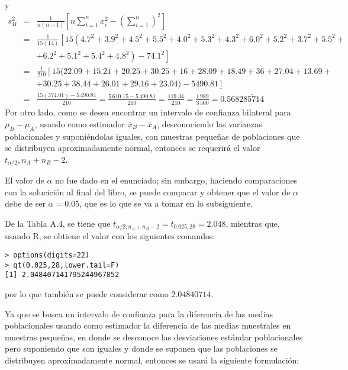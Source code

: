 \begin{solucion}
 y
 \begin{eqnarray*}
  s_B^2 & = & \frac{1}{n(n-1)} \left[ n\sum_{i=1}^n x_i^2 - \left( \sum_{i=1}^n \right)^2 \right] \\
  & = & \frac{1}{15(14)} \left[ 15\left( 4.7^2 + 3.9^2 + 4.5^2 + 5.5^2 + 4.0^2 + 5.3^2 + 4.3^2 + 6.0^2 + 5.2^2 + 3.7^2 + 5.5^2 + \right. \right. \\
  & & \left. \left. + 6.2^2 + 5.1^2 + 5.4^2 + 4.8^2 \right) - 74.1^2 \right] \\
  & = & \frac{1}{210}\left[ 15( 22.09 + 15.21 + 20.25 + 30.25 + 16 + 28.09 + 18.49 + 36 + 27.04 + 13.69 + \right. \\
  & & \left. + 30.25 + 38.44 + 26.01 + 29.16 + 23.04 ) - 5490.81 \right] \\
  & = & \frac{15(374.01) - 5\,490.81}{210} = \frac{5\,610.15 - 5\,490.81}{210} = \frac{119.34}{210} = \frac{1\,989}{3\,500} = 0.568\overline{285714}
 \end{eqnarray*}
 Por otro lado, como se desea encontrar un intervalo de confianza bilateral para $\mu_B - \mu_A$, usando como estimador $\bar{x}_B - \bar{x}_A$, desconociendo las varianzas poblacionales y suponi\'endolas iguales, con muestras peque\~nas de poblaciones que se distribuyen aproximadamente normal, entonces se requerir\'a el valor $t_{\alpha/2},n_A+n_B-2$.
 \par 
 El valor de $\alpha$ no fue dado en el enunciado; sin embargo, haciendo comparaciones con la solucici\'on al final del libro, se puede comparar y obtener que el valor de $\alpha$ debe de ser $\alpha=0.05$, que es lo que se va a tomar en lo subsiguiente.
 \par 
 De la Tabla A.4, se tiene que $t_{\alpha/2,n_A+n_B-2} = t_{0.025,28} = 2.048$, mientras que, usando R, se obtiene el valor con los siguientes comandos:
 \begin{verbatim}
> options(digits=22)
> qt(0.025,28,lower.tail=F)
[1] 2.048407141795244967852
 \end{verbatim}
 \vspace{-0.5cm}
 por lo que tambi\'en se puede considerar como $2.04840714$.
 \par 
 Ya que se busca un intervalo de confianza para la diferencia de las medias poblacionales usando como estimador la diferencia de las medias muestrales en muestras peque\~nas, en donde se desconoce las desviaciones est\'andar poblacionales pero suponiendo que son iguales y donde se suponen que las poblaciones se distribuyen aproximadamente normal, entonces se usar\'a la siguiente formulaci\'on:

\end{solucion}
